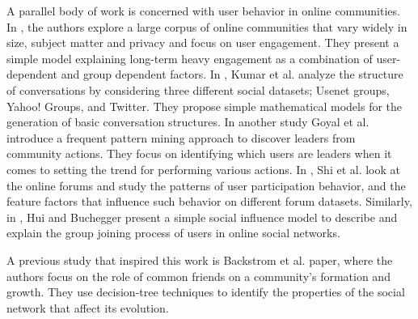 A parallel body of work is concerned with user behavior in online communities.
In \cite{pref_behav}, the authors explore a large corpus of online
communities that vary widely in size, subject matter and privacy and focus on user
engagement. They present a simple model explaining long-term heavy
engagement as a combination of user-dependent and group dependent factors. 
In \cite{dyn_conversations}, Kumar et al. analyze the structure of conversations by considering three different social datasets; Usenet groups, Yahoo! Groups, and Twitter. They propose simple mathematical models for the generation of basic conversation structures.
In another study Goyal et al. \cite{leaders} introduce a frequent pattern mining approach 
to discover leaders from community actions. They focus on identifying which users 
are leaders when it comes to setting the trend for performing various actions.
In \cite{user_grouping}, Shi et al. look at the online forums and study the patterns of user participation behavior, and the feature factors that influence such behavior on different forum datasets.
Similarly, in \cite{groupthink}, Hui and Buchegger present a simple social influence model to 
describe and explain the group joining process of users in online social networks.

A previous study that inspired this work is  Backstrom
et al. \cite{group_formation} paper, where the authors focus on the role of common
friends on a community's formation and growth. They use decision-tree techniques
to identify the properties of the social network that affect its evolution.

